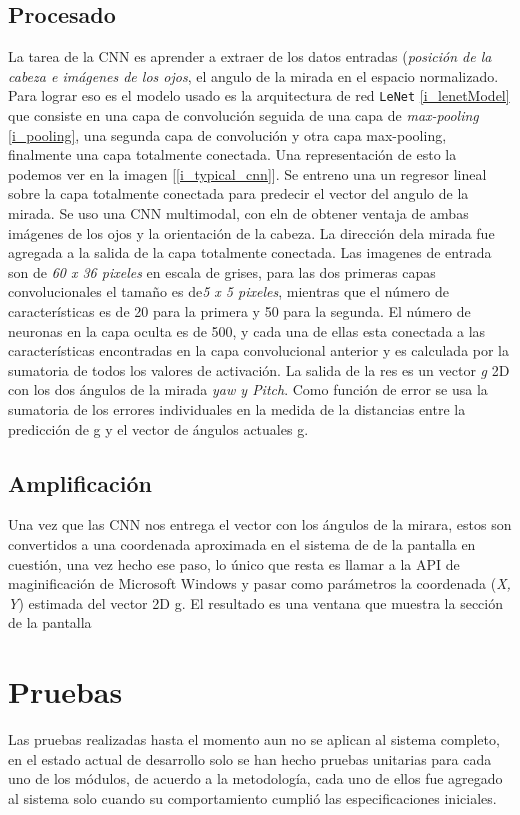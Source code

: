\documentclass[12pt]{book} %
\begin{document}
	\subsection{Procesado}
		La tarea de la CNN es aprender a extraer de los datos entradas (\textit{posición de la cabeza e imágenes de los ojos}, el angulo de la
		mirada en el espacio normalizado.
		Para lograr eso es el modelo usado es la arquitectura de red \texttt{LeNet} \ref{i_lenetModel} que consiste en una capa de convolución 
		seguida de una capa 	de \textit{max-pooling} \ref{i_pooling}, una segunda capa de convolución y otra capa max-pooling, finalmente una 
		capa totalmente conectada.
		Una representación de esto la podemos ver en la imagen [\ref{i_typical_cnn}].
		Se entreno una un regresor lineal sobre la capa totalmente conectada para predecir el vector del angulo de la mirada. Se uso una 
		CNN multimodal, con eln de obtener ventaja de ambas imágenes de los ojos y la orientación de la cabeza.
		La dirección dela mirada fue agregada a la salida de la capa totalmente conectada.
		Las imagenes de entrada son de \textit{60 x 36 pixeles} en escala de grises, para las dos primeras capas convolucionales el tamaño
		es de\textit{5 x 5 pixeles}, mientras que el número de características es de 20 para la primera y 50 para la segunda. El número de 
		neuronas en la capa oculta es de 500, y cada una de ellas esta conectada a las características encontradas en la capa convolucional 
		anterior y es calculada por la sumatoria de todos los valores de activación. La salida de la res es un vector \textit{g} 2D 
		con los dos ángulos de la mirada \textit{yaw y Pitch}. Como función de error se usa la sumatoria de los errores individuales en la
		medida de la distancias entre la predicción de g y el vector de ángulos actuales g.
		
	\subsection{Amplificación}
		Una 	vez que las CNN nos entrega el vector con los ángulos de la mirara, estos son convertidos a una coordenada aproximada en 
		el sistema de de la pantalla en cuestión, una vez hecho ese paso, lo único que resta es llamar a la API de maginificación de 
		Microsoft Windows y pasar como parámetros la coordenada (\textit{X, Y}) estimada del vector 2D g.
		El resultado es una ventana que muestra la sección de la pantalla
	
\newpage	
\section{Pruebas}
	Las pruebas realizadas hasta el momento aun no se aplican al sistema completo, en el estado actual de desarrollo solo se han hecho pruebas
	unitarias para cada uno de los módulos, de acuerdo a la metodología, cada uno de ellos fue agregado al sistema solo cuando su comportamiento 
	cumplió las  especificaciones iniciales.
	
\end{document}
